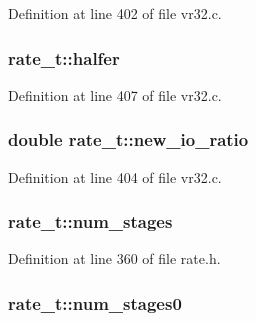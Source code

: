 Definition at line 402 of file vr32.\+c.

\subsubsection[{\texorpdfstring{halfer}{halfer}}]{ rate\+\_\+t\+::halfer}\hypertarget{structrate__t_a03e79fd9212758b1d773b487a1f66f63}{}\label{structrate__t_a03e79fd9212758b1d773b487a1f66f63}


Definition at line 407 of file vr32.\+c.

\subsubsection[{\texorpdfstring{new\+\_\+io\+\_\+ratio}{new_io_ratio}}]{\setlength{\rightskip}{0pt plus 5cm}double rate\+\_\+t\+::new\+\_\+io\+\_\+ratio}\hypertarget{structrate__t_ab5e0424ac7aa7763f539a80a39296e64}{}\label{structrate__t_ab5e0424ac7aa7763f539a80a39296e64}


Definition at line 404 of file vr32.\+c.

\subsubsection[{\texorpdfstring{num\+\_\+stages}{num_stages}}]{ rate\+\_\+t\+::num\+\_\+stages}\hypertarget{structrate__t_abb2523f280abe614cfde5e2fcfc151b7}{}\label{structrate__t_abb2523f280abe614cfde5e2fcfc151b7}


Definition at line 360 of file rate.\+h.

\subsubsection[{\texorpdfstring{num\+\_\+stages0}{num_stages0}}]{ rate\+\_\+t\+::num\+\_\+stages0}\hypertarget{structrate__t_ac3f570df4ab01d424ef1e3bc4611f081}{}\label{structrate__t_ac3f570df4ab01d424ef1e3bc4611f081}


